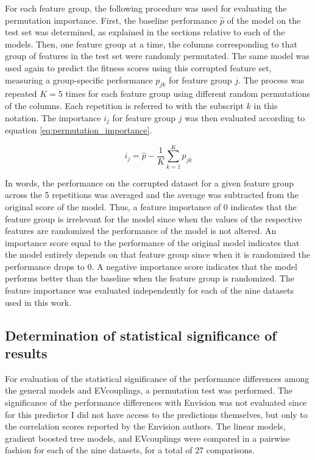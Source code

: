 For each feature group, the following procedure was used for evaluating the permutation importance.
First, the baseline performance $\hat{p}$ of the model on the test set was determined, as explained in the sections relative to each of the models.
Then, one feature group at a time, the columns corresponding to that group of features in the test set were randomly permutated.
The same model was used again to predict the fitness scores using this corrupted feature set, measuring a group-specific performance $p_{jk}$ for feature group $j$.
The process was repeated $K=5$ times for each feature group using different random permutations of the columns.
Each repetition is referred to with the subscript $k$ in this notation.
The importance $i_j$ for feature group $j$ was then evaluated according to equation \autoref{eq:permutation_importance}.

\begin{equation}\label{eq:permutation_importance}
	i_j = \hat{p} - \frac{1}{K} \sum_{k=1}^K p_{jk}
\end{equation}

In words, the performance on the corrupted dataset for a given feature group across the \num{5} repetitions was averaged and the average was subtracted from the original score of the model.
Thus, a feature importance of \num{0} indicates that the feature group is irrelevant for the model since when the values of the respective features are randomized the performance of the model is not altered.
An importance score equal to the performance of the original model indicates that the model entirely depends on that feature group since when it is randomized the performance drops to \num{0}.
A negative importance score indicates that the model performs better than the baseline when the feature group is randomized.
The feature importance was evaluated independently for each of the nine datasets used in this work.

\subsection{Determination of statistical significance of results}\label{mm:significance}
For evaluation of the statistical significance of the performance differences among the general models and EVcouplings, a permutation test was performed.
The significance of the performance differences with Envision was not evaluated since for this predictor I did not have access to the predictions themselves, but only to the correlation scores reported by the Envision authors.
The linear models, gradient boosted tree models, and EVcouplings were compared in a pairwise fashion for each of the nine datasets, for a total of \num{27} comparisons.

